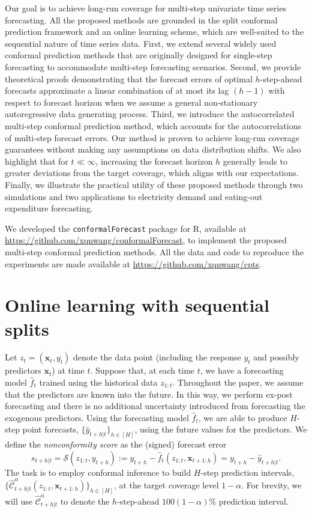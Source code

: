 \documentclass[
  11pt,
  12pt]{article}
\theoremstyle{plain}
\theoremstyle{remark}
\begin{document}
Our goal is to achieve long-run coverage for multi-step univariate time
series forecasting. All the proposed methods are grounded in the split
conformal prediction framework and an online learning scheme, which are
well-suited to the sequential nature of time series data. First, we
extend several widely used conformal prediction methods that are
originally designed for single-step forecasting to accommodate
multi-step forecasting scenarios. Second, we provide theoretical proofs
demonstrating that the forecast errors of optimal \(h\)-step-ahead
forecasts approximate a linear combination of at most its lag \((h-1)\)
with respect to forecast horizon when we assume a general non-stationary
autoregressive data generating process. Third, we introduce the
autocorrelated multi-step conformal prediction method, which accounts
for the autocorrelations of multi-step forecast errors. Our method is
proven to achieve long-run coverage guarantees without making any
assumptions on data distribution shifts. We also highlight that for
\(t \ll \infty\), increasing the forecast horizon \(h\) generally leads
to greater deviations from the target coverage, which aligns with our
expectations. Finally, we illustrate the practical utility of these
proposed methods through two simulations and two applications to
electricity demand and eating-out expenditure forecasting.

We developed the \texttt{conformalForecast} package for R, available at
\url{https://github.com/xqnwang/conformalForecast}, to implement the
proposed multi-step conformal prediction methods. All the data and code
to reproduce the experiments are made available at
\url{https://github.com/xqnwang/cpts}.

\section{Online learning with sequential splits}\label{sec-setup}

Let \(z_t = (\bm{x}_t, y_t)\) denote the data point (including the
response \(y_t\) and possibly predictors \(\bm{x}_t\)) at time \(t\).
Suppose that, at each time \(t\), we have a forecasting model
\(\hat{f}_t\) trained using the historical data \(z_{1:t}\). Throughout
the paper, we assume that the predictors are known into the future. In
this way, we perform ex-post forecasting and there is no additional
uncertainty introduced from forecasting the exogenous predictors. Using
the forecasting model \(\hat{f}_t\), we are able to produce \(H\)-step
point forecasts, \(\{\hat{y}_{t+h|t}\}_{h\in[H]}\), using the future
values for the predictors. We define the \emph{nonconformity score} as
the (signed) forecast error \[
s_{t+h|t}=\mathcal{S}(z_{1:t}, y_{t+h}):=y_{t+h}-\hat{f}_t(z_{1:t},\bm{x}_{t+1:h})=y_{t+h}-\hat{y}_{t+h|t}.
\] The task is to employ conformal inference to build \(H\)-step
prediction intervals,
\(\{\hat{\mathcal{C}}_{t+h|t}^{\alpha}(z_{1:t},\bm{x}_{t+1:h})\}_{h\in[H]}\),
at the target coverage level \(1-\alpha\). For brevity, we will use
\(\hat{\mathcal{C}}_{t+h|t}^{\alpha}\) to denote the \(h\)-step-ahead
\(100(1-\alpha)\%\) prediction interval.
\end{document}
